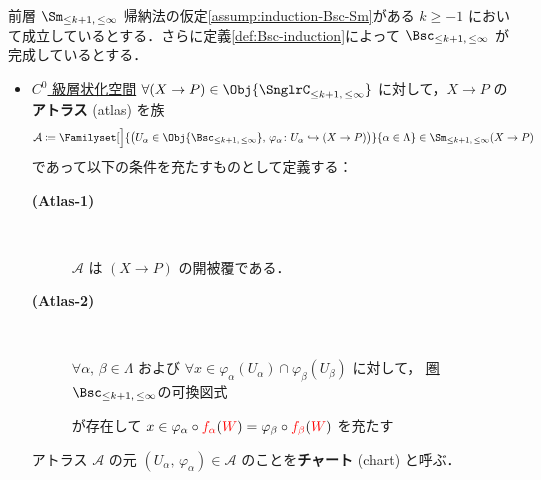 \documentclass[TQFT_main]{subfiles}
\begin{document}
\begin{mydef}[label=def:Sm-induction,breakable]{前層 $\Sm_{\le k+1,\, \le \infty}$}
    帰納法の仮定\ref{assump:induction-Bsc-Sm}がある $k \ge -1$ において成立しているとする．さらに定義\ref{def:Bsc-induction}によって $\Bsc_{\le k+1,\, \le \infty}$ が完成しているとする．
    \begin{itemize}
        \item \hyperref[def:Snglr-C0]{$C^0$ 級層状化空間} $\forall (X \to P) \in \Obj{\SnglrC_{\le k+1,\, \le \infty}}$ に対して，$X \to P$ の\textbf{アトラス} (atlas) を族
        \begin{align}
            \mathcal{A} \coloneqq \Familyset[\Big]{\bigl(U_\alpha \in \Obj{\Bsc_{\le k+1,\, \le \infty}},\, \varphi_\alpha \colon U_\alpha \hookrightarrow (X \to P)\bigr)}{\alpha \in \Lambda} \in \Sm_{\le k+1,\, \le \infty} (X \to P)
        \end{align}
        であって以下の条件を充たすものとして定義する：
        \begin{description}
            \item[\textbf{(Atlas-1)}]　
            
            $\mathcal{A}$ は $(X \to P)$ の開被覆である．
    
            \item[\textbf{(Atlas-2)}]　
            
            $\forall \alpha,\, \beta \in \Lambda$ および $\forall x \in \varphi_\alpha (U_\alpha) \cap \varphi_\beta (U_\beta)$ に対して，
            \hyperref[def:Bsc-induction]{圏 $\Bsc_{\le k+1,\, \le \infty}$}の可換図式
            \begin{center}
            \end{center}
            が存在して $x \in \varphi_\alpha \circ \textcolor{red}{f_\alpha} (\textcolor{red}{W}) = \varphi_\beta \circ \textcolor{red}{f_\beta} (\textcolor{red}{W})$ を充たす
        \end{description}
        アトラス $\mathcal{A}$ の元 $(U_\alpha,\, \varphi_\alpha) \in \mathcal{A}$ のことを\textbf{チャート} (chart) と呼ぶ．


\end{itemize}
\end{mydef}
\end{document}
